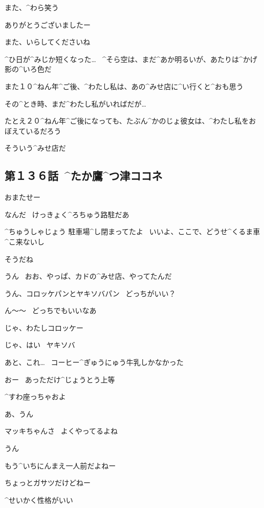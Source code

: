 \page
\Narrator また、^{わら}{笑}う

\page
\Alpha ありがとうございましたー

\Alpha また、いらしてくださいね

\page
\Narrator ^{ひ}{日}が^{みじか}{短}くなった…
\ ^{そら}{空}は、まだ^{あか}{明}るいが、あたりは^{かげ}{影}の^{いろ}{色}だ

\Narrator また１０^{ねん}{年}^{ご}{後}、^{わたし}{私}は、あの^{みせ}{店}に^{い}{行}くと^{おも}{思}う

\Narrator その^{とき}{時}、まだ^{わたし}{私}がいればだが…

\Narrator たとえ２０^{ねん}{年}^{ご}{後}になっても、たぶん^{かのじょ}{彼女}は、^{わたし}{私}をおぼえているだろう

\page
\Narrator そういう^{みせ}{店}だ


\subsection{第１３６話\ ^{たか}{鷹}^{つ}{津}ココネ}

\page[74]
\Kokone おまたせー

\page
\Kokone なんだ
\ けっきょく^{ろちゅう}{路駐}だあ

\Shiba ^{ちゅうしゃじょう }{駐車場}^{し}{閉}まってたよ
\ いいよ、ここで、どうせ^{くるま}{車}^{こ}{来}ないし

\Kokone そうだね

\Shiba うん
\ おお、やっぱ、カドの^{みせ}{店}、やってたんだ

\page
\Kokone うん、コロッケパンとヤキソバパン
\ どっちがいい？

\Shiba ん〜〜
\ どっちでもいいなあ

\Kokone じゃ、わたしコロッケー

\Kokone じゃ、はい
\ ヤキソバ

\Kokone あと、これ…
\ コーヒー^{ぎゅうにゅう}{牛乳}しかなかった

\Shiba おー
\ あっただけ^{じょうとう}{上等}

\Kokone ^{すわ}{座}っちゃおよ

\Shiba あ、うん

\page[78]
\Shiba マッキちゃんさ
\ よくやってるよね

\Kokone うん

\Kokone もう^{いちにんまえ}{一人前}だよねー

\Shiba ちょっとガサツだけどねー

\Shiba ^{せいかく}{性格}がいい

